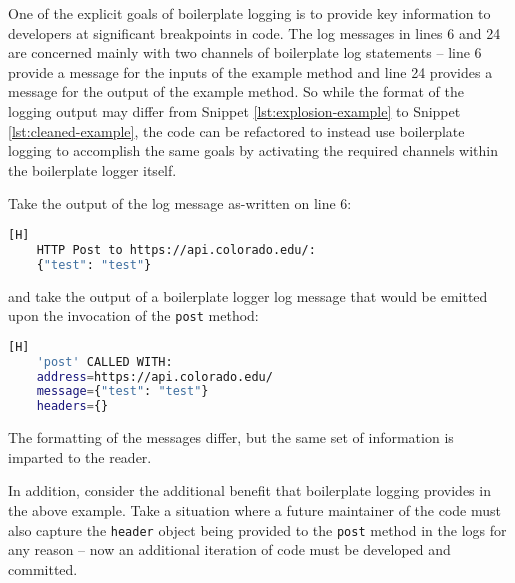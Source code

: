 \documentclass[acmsmall,review,authorversion]{acmart}
\begin{document}
    One of the explicit goals of boilerplate logging is to provide key information to developers at significant breakpoints in code. The log messages in lines 6 and 24 are concerned mainly with two channels of boilerplate log statements -- line 6 provide a message for the inputs of the example method and line 24 provides a message for the output of the example method. So while the format of the logging output may differ from Snippet \ref{lst:explosion-example} to Snippet \ref{lst:cleaned-example}, the code can be refactored to instead use boilerplate logging to accomplish the same goals by activating the required channels within the boilerplate logger itself.
    
    Take the output of the log message as-written on line 6:

    \begin{lstlisting}[language=bash][H]
    HTTP Post to https://api.colorado.edu/:
    {"test": "test"}
    \end{lstlisting}

    and take the output of a boilerplate logger log message that would be emitted upon the invocation of the \lstinline{post} method:

    \begin{lstlisting}[language=bash][H]
    'post' CALLED WITH: 
    address=https://api.colorado.edu/
    message={"test": "test"}
    headers={}
    \end{lstlisting}
    
    The formatting of the messages differ, but the same set of information is imparted to the reader. 
    
    In addition, consider the additional benefit that boilerplate logging provides in the above example. Take a situation where a future maintainer of the code must also capture the \lstinline{header} object being provided to the \lstinline{post} method in the logs for any reason -- now an additional iteration of code must be developed and committed.
    
\end{document}
